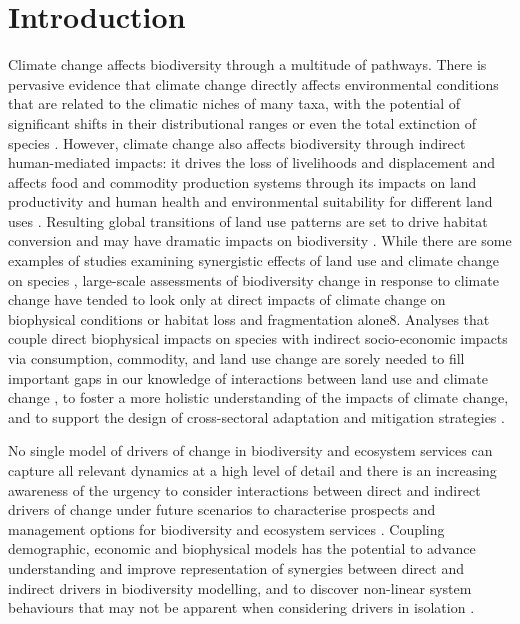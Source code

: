 \documentclass[titlesmallcaps,copyrightpage]{uomthesis}\usepackage[]{graphicx}\usepackage[]{color}
\begin{document}
\section{Introduction}
Climate change affects biodiversity through a multitude of pathways. There is pervasive evidence that climate change directly affects environmental conditions that are related to the climatic niches of many taxa, with the potential of significant shifts in their distributional ranges or even the total extinction of species \citep{ipbes_summary_2019, struebig_targeted_2015}. However, climate change also affects biodiversity through indirect human-mediated impacts: it drives the loss of livelihoods and displacement \citep{mcmichael_climate_2006} and affects food and commodity production systems through its impacts on land productivity and human health\citep{roson_estimation_2016, tol_who_2014} and environmental suitability for different land uses \citep{veldkamp_clue_1996, verburg_combining_2009}. Resulting global transitions of land use patterns are set to drive habitat conversion and may have dramatic impacts on biodiversity \citep{mantyka-pringle_climate_2015,oliver_interactions_2014, newbold2019climate}. While there are some examples of studies examining synergistic effects of land use and climate change on species \citep{brodie_synergistic_2016, brambilla_climate_2016}, large-scale assessments of biodiversity change in response to climate change have tended to look only at direct impacts of climate change on biophysical conditions or habitat loss and fragmentation alone8. Analyses that couple direct biophysical impacts on species with indirect socio-economic impacts via consumption, commodity, and land use change are sorely needed to fill important gaps in our knowledge of interactions between land use and climate change \citep{newbold2019climate}, to foster a more holistic understanding of the impacts of climate change, and to support the design of cross-sectoral adaptation and mitigation strategies \citep{ipbes_summary_2016}.

No single model of drivers of change in biodiversity and ecosystem services can capture all relevant dynamics at a high level of detail and there is an increasing awareness of the urgency to consider interactions between direct and indirect drivers of change under future scenarios to characterise prospects and management options for biodiversity and ecosystem services \citep{ipbes_summary_2016}. Coupling demographic, economic and biophysical models has the potential to advance understanding and improve representation of synergies between direct and indirect drivers in biodiversity modelling, and to discover non-linear system behaviours that may not be apparent when considering drivers in isolation \citep{ipbes_summary_2016}.
\end{document}
